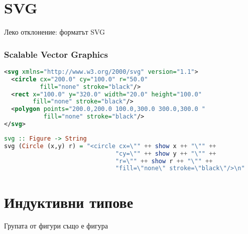 \documentclass{beamer}
\begin{document}
\section{SVG}

\begin{frame}
  \centerline{Леко отклонение: форматът SVG}
\end{frame}


\begin{frame}[fragile]
  \frametitle{Scalable Vector Graphics}
  
\begin{lstlisting}[basicstyle=\tiny,language=xml]
<svg xmlns="http://www.w3.org/2000/svg" version="1.1">
  <circle cx="200.0" cy="100.0" r="50.0" 
          fill="none" stroke="black"/>
  <rect x="100.0" y="320.0" width="20.0" height="100.0" 
        fill="none" stroke="black"/>
  <polygon points="200.0,200.0 100.0,300.0 300.0,300.0 " 
           fill="none" stroke="black"/>
</svg>  
\end{lstlisting}

\bigskip

\begin{lstlisting}[basicstyle=\tiny,language=haskell]
svg :: Figure -> String
svg (Circle (x,y) r) = "<circle cx=\"" ++ show x ++ "\"" ++
                               "cy=\"" ++ show y ++ "\"" ++ 
                               "r=\"" ++ show r ++ "\"" ++ 
                               "fill=\"none\" stroke=\"black\"/>\n"
\end{lstlisting}

\end{frame}

\section{Индуктивни типове}

\begin{frame}
  \centerline{Групата от фигури също е фигура}
\end{frame}
\end{document}
